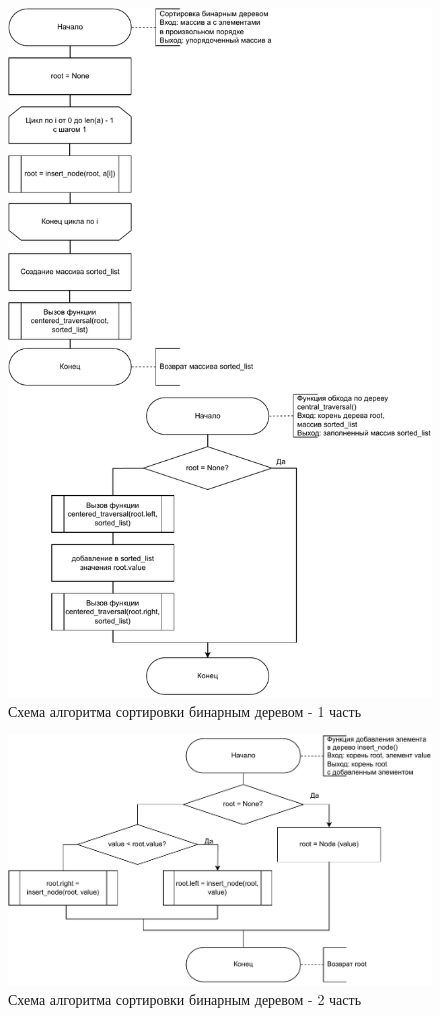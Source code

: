 \begin{figure}[h!]
	\centering
	\includegraphics[width=0.8\linewidth]{img/bin_tree}
	\caption{Схема алгоритма сортировки бинарным деревом - 1 часть}
	\label{fig:bin_tree}
\end{figure}
\begin{figure}[h!]
	\centering
	\includegraphics[width=0.8\linewidth]{img/bin_tree2}
	\caption{Схема алгоритма сортировки бинарным деревом - 2 часть}
	\label{fig:bin_tree2}
\end{figure}
